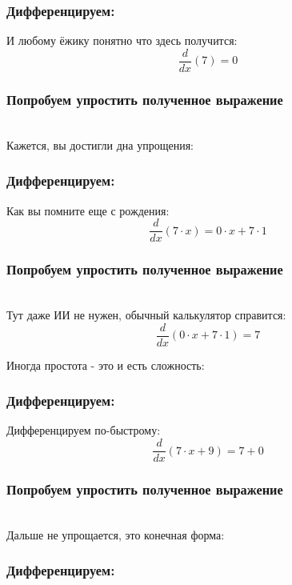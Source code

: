 \documentclass[a4paper,12pt]{article}
\begin{document}
\subsubsection*{Дифференцируем:}

И любому ёжику понятно что здесь получится:
\begin{dmath}\frac{d}{dx}\left(7\right)=0\end{dmath}
\subsubsection*{Попробуем упростить полученное выражение}
\\Кажется, вы достигли дна упрощения:

\subsubsection*{Дифференцируем:}

Как вы помните еще с рождения:
\begin{dmath}\frac{d}{dx}\left(7\cdot x\right)=0\cdot x+ 7\cdot 1\end{dmath}
\subsubsection*{Попробуем упростить полученное выражение}
\\Тут даже ИИ не нужен, обычный калькулятор справится:\\
\begin{dmath}
	\frac{d}{dx}\left(0\cdot x+ 7\cdot 1\right) = 7\end{dmath}

Иногда простота - это и есть сложность:

\subsubsection*{Дифференцируем:}

Дифференцируем по-быстрому:
\begin{dmath}\frac{d}{dx}\left(7\cdot x+ 9\right)=7+ 0\end{dmath}
\subsubsection*{Попробуем упростить полученное выражение}
\\Дальше не упрощается, это конечная форма:

\subsubsection*{Дифференцируем:}
\end{document}

